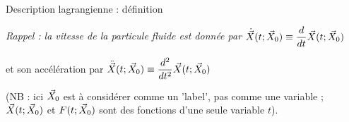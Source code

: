 \begin{frame}{Description lagrangienne : définition}
\pause
\bigskip

{\color{bleu}

\slshape
Rappel : la vitesse de la particule fluide est donnée par 
$\dot{\vec{X}}(t; \vec{X}_0) \equiv \displaystyle \frac{d }{dt}\vec{X}(t; \vec{X}_0)$

\smallskip

\hspace{34mm} et son accélération par 
$\displaystyle \ddot{\vec{X}}(t; \vec{X}_0) \equiv \frac{ d^2 }{d t^2}\vec{X}(t; \vec{X}_0)$
}

\pause
\smallskip
(NB : ici $\vec{X}_0$ est à considérer comme un 'label', pas comme une variable ; $\vec{X}(t ; \vec{X}_0)$ et $F(t ; \vec{X}_0)$ sont des fonctions d'une seule variable $t$).



\vspace{0mm}

\end{frame}

